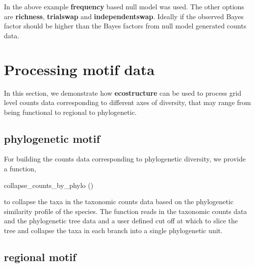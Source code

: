 \documentclass[12pt]{article}
\begin{document}
In the above example \textbf{frequency} based null model was used. The other options are \textbf{richness}, \textbf{trialswap} and \textbf{independentswap}. Ideally if the observed Bayes factor should be higher than the Bayes factors from null model generated counts data.


\section{Processing motif data}

In this section, we demonstrate how \textbf{ecostructure} can be used to process
grid level counts data corresponding to different axes of diversity, that may range from being functional to regional to phylogenetic.

\subsection{phylogenetic motif}

For building the counts data corresponding to phylogenetic diversity, we provide a function,
\begin{verb} collapse_counts_by_phylo () \end{verb} to collapse the taxa in the taxonomic counts data based on the phylogenetic similarity profile of the species.
The function reads in the taxonomic counts data and the phylogenetic tree data and a user defined cut off at which to slice the tree and collapse the taxa in each branch into a single phylogenetic unit.

\begin{knitrout}
\color{fgcolor}\begin{kframe}
\begin{alltt}
 \hlkwb{<-} \hlopt{::}\hlstd{(}\hlstd{(}\hlstd{,}
                                   \hlstd{,}
                                     \hlstd{=} \hlstd{))}
 \hlkwb{<-} 
                                           \hlstd{=} \hlstd{)}
\end{alltt}
\end{kframe}
\end{knitrout}

\subsection{regional motif}
\end{document}
